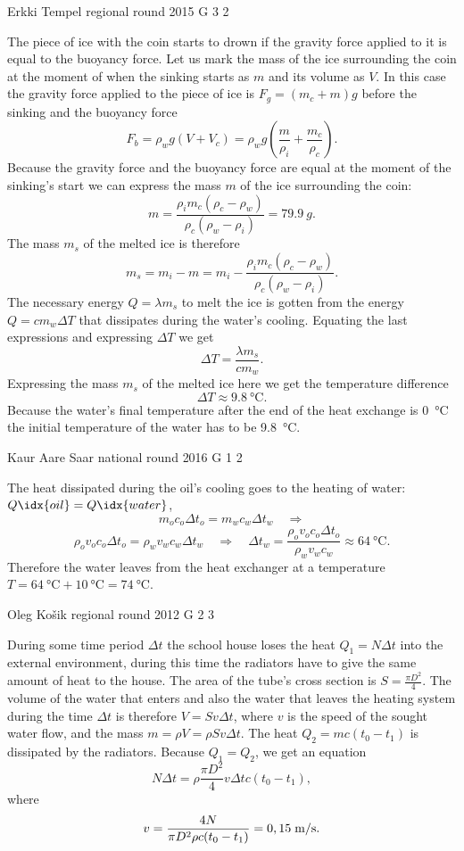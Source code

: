\documentclass[11pt]{article}
\begin{document}
{Erkki Tempel} %
{regional round} %
{2015} %
{G 3} %
{2} %
{

\ifEngSolution
The piece of ice with the coin starts to drown if the gravity force applied to it is equal to the buoyancy force. Let us mark the mass of the ice surrounding the coin at the moment of when the sinking starts as $m$ and its volume as $V$. In this case the gravity force applied to the piece of ice is $F_g=(m_c+m)g$ before the sinking and the buoyancy force 
\[ F_b=\rho_w g(V + V_c)=\rho_w g\left(\frac{m}{\rho_i} + \frac{m_c}{\rho_c}\right). \]
Because the gravity force and the buoyancy force are equal at the moment of the sinking's start we can express the mass $m$ of the ice surrounding the coin:
\[ m = \frac{\rho_i m_c(\rho_c - \rho_w)}{\rho_c(\rho_w - \rho_i)} = \SI{79,9}{g}. \] 
The mass $m_s$ of the melted ice is therefore
\[ m_s = m_i - m = m_i - \frac{\rho_i m_c(\rho_c - \rho_w)}{\rho_c(\rho_w - \rho_i)}. \]
The necessary energy $Q=\lambda m_s$ to melt the ice is gotten from the energy $Q=cm_w\Delta T$ that dissipates during the water's cooling. Equating the last expressions and expressing $\Delta T$ we get 
\[ \Delta  T = \frac{\lambda m_s}{cm_w}. \] 
Expressing the mass $m_s$ of the melted ice here we get the temperature difference
\[ \Delta T \approx \SI{9,8}{\celsius}. \] 
Because the water's final temperature after the end of the heat exchange is \SI{0}{\celsius} the initial temperature of the water has to be \SI{9,8}{\celsius}.
\fi
}

{Kaur Aare Saar} %
{national round} %
{2016} %
{G 1} %
{2} %
{

\ifEngSolution
The heat dissipated during the oil's cooling goes to the heating of water: $Q\idx{oil} = Q\idx{water}$,
\[ m_oc_o\Delta t_o = m_wc_w\Delta t_w \quad\Rightarrow \]
\[ \rho_ov_oc_o\Delta t_o = \rho_w v_wc_w\Delta t_w \quad\Rightarrow\quad \Delta t_w = \frac{\rho_ov_oc_o\Delta t_o}{\rho_wv_wc_w} \approx \SI{64}{\celsius}.  \]
Therefore the water leaves from the heat exchanger at a temperature $T = \SI{64}{\celsius} + \SI{10}{\celsius} = \SI{74}{\celsius}$.
\fi
}

{Oleg Košik} %
{regional round} %
{2012} %
{G 2} %
{3} %
{

\ifEngSolution
During some time period $\Delta t$ the school house loses the heat $Q_1=N\Delta t$ into the external environment, during this time the radiators have to give the same amount of heat to the house. The area of the tube's cross section is $S=\frac{\pi D^2}{4}$. The volume of the water that enters and also the water that leaves the heating system during the time $\Delta t$ is therefore $V=Sv\Delta t$, where $v$ is the speed of the sought water flow, and the mass $m=\rho V=\rho Sv\Delta t$. The heat $Q_2=mc(t_0-t_1)$ is dissipated by the radiators. Because $Q_1=Q_2$, we get an equation
\[
N\Delta t=\rho \frac{\pi D^2}{4}v\Delta t c (t_0-t_1),
\] 
where 
\[
v=\frac{4N}{\pi D^2\rho c (t_0-t_1)}=0,15\;\hbox{m/s}.
\]
\fi
}
\end{document}
